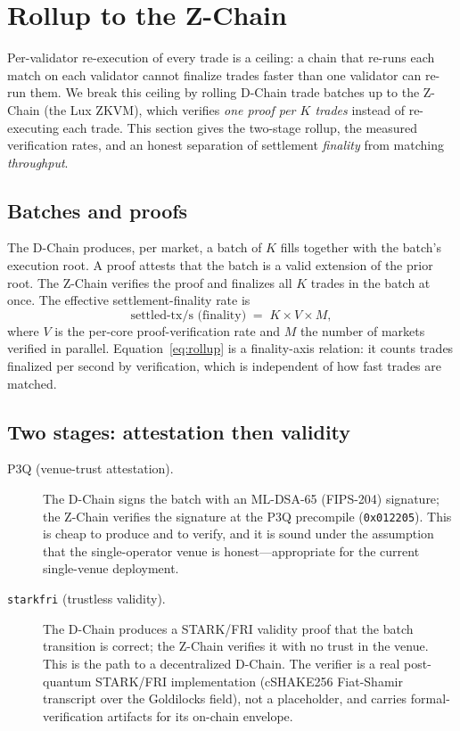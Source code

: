 \section{Rollup to the Z-Chain}
\label{sec:rollup}

Per-validator re-execution of every trade is a ceiling: a chain that re-runs each match on
each validator cannot finalize trades faster than one validator can re-run them. We break
this ceiling by rolling D-Chain trade batches up to the Z-Chain (the Lux ZKVM), which
verifies \emph{one proof per $K$ trades} instead of re-executing each trade. This section
gives the two-stage rollup, the measured verification rates, and an honest separation of
settlement \emph{finality} from matching \emph{throughput}.

\subsection{Batches and proofs}

The D-Chain produces, per market, a batch of $K$ fills together with the batch's execution
root. A proof attests that the batch is a valid extension of the prior root. The Z-Chain
verifies the proof and finalizes all $K$ trades in the batch at once. The effective
settlement-finality rate is
\begin{equation}
  \text{settled-tx/s (finality)} \;=\; K \times V \times M,
  \label{eq:rollup}
\end{equation}
where $V$ is the per-core proof-verification rate and $M$ the number of markets verified in
parallel. Equation~\eqref{eq:rollup} is a finality-axis relation: it counts trades finalized
per second by verification, which is independent of how fast trades are matched.

\subsection{Two stages: attestation then validity}

\begin{description}
  \item[P3Q (venue-trust attestation).] The D-Chain signs the batch with an ML-DSA-65
  (FIPS-204) signature; the Z-Chain verifies the signature at the P3Q precompile
  (\texttt{0x012205}). This is cheap to produce and to verify, and it is sound under the
  assumption that the single-operator venue is honest---appropriate for the current
  single-venue deployment.
  \item[\texttt{starkfri} (trustless validity).] The D-Chain produces a STARK/FRI validity
  proof that the batch transition is correct; the Z-Chain verifies it with no trust in the
  venue. This is the path to a decentralized D-Chain. The verifier is a real post-quantum
  STARK/FRI implementation (cSHAKE256 Fiat-Shamir transcript over the Goldilocks field), not
  a placeholder, and carries formal-verification artifacts for its on-chain envelope.
\end{description}

